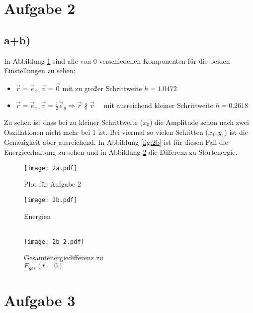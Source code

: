 \documentclass[paper=a4, ngerman]{scrartcl}
\begin{document}
\section{Aufgabe 2}
\subsection{a+b)}

In Abbildung \ref{fig:2a} sind alle von 0 verschiedenen Komponenten für die beiden Einstellungen zu sehen:
\begin{itemize}
\item $\vec{r} = \vec{e}_x, \vec{v} = \vec{0}$ \hspace{2cm} mit zu großer Schrittweite $h = \num{1.0472}$
\item $\vec{r} = \vec{e}_x, \vec{v} = \frac12\vec{e}_y \Rightarrow \vec{r} \nparallel \vec{v}$ ~\, mit ausreichend kleiner 
Schrittweite $h = \num{0.2618}$
\end{itemize}

Zu sehen ist dass bei zu kleiner Schrittweite ($x_0$) die Amplitude schon nach zwei Oszillationen nicht mehr bei 1 ist. Bei viermal so vielen Schritten ($x_1, y_1$) ist die Genauigkeit aber ausreichend. In Abbildung \ref{fig:2b} ist für diesen Fall die Energieerhaltung zu sehen und in Abbildung \ref{fig:2b_2} die Differenz zu Startenergie.
\vfill
\begin{figure}[htbp]
	\centering
	\texttt{[image: 2a.pdf]}
	\caption{Plot für Aufgabe 2}
	\label{fig:2a}
\end{figure}
\vfill
\newpage

\begin{figure}[htbp]
    \centering
    \begin{minipage}{.49\textwidth}
        \centering
        \texttt{[image: 2b.pdf]}
        \caption{Energien\\~}
        \label{fig:2b}
    \end{minipage}
    \begin{minipage}{.49\textwidth}
        \centering
        \texttt{[image: 2b\_2.pdf]}
        \caption{Gesamtenergiedifferenz zu\\$E_{ges}(t=0)$}
        \label{fig:2b_2}
    \end{minipage}
\end{figure} 

\section{Aufgabe 3}
\end{document}
